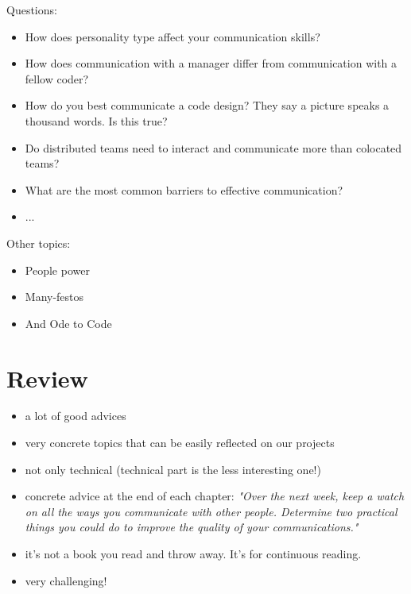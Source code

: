 \documentclass{mypresentation}
\begin{document}
Questions:
\begin{itemize}
\item How does personality type affect your communication skills?
\item How does communication with a manager differ from communication with a fellow coder?
\item How do you best communicate a code design? They say a picture speaks a thousand words. Is this true?
\item Do distributed teams need to interact and communicate more than colocated teams?
\item What are the most common barriers to effective communication?
\item ...
\end{itemize}
\newpage

Other topics:
\begin{itemize}
\item People power
\item Many-festos
\item And Ode to Code
\end{itemize}
\newpage

\section{Review}
\begin{itemize}
\item a lot of good advices
\item very concrete topics that can be easily reflected on our projects
\item not only technical (technical part is the less interesting one!)
\item concrete advice at the end of each chapter: \textit{"Over the next week, keep a watch on all the ways you communicate with other people. Determine two practical things you could do to improve the quality of your communications."}
\item it's not a book you read and throw away. It's for continuous reading.
\item very challenging!
\end{itemize}
\newpage

\end{document}
